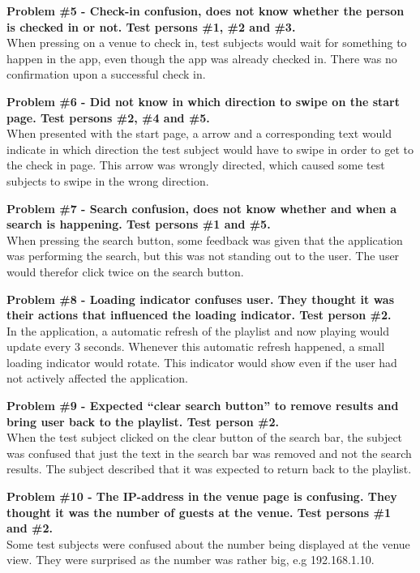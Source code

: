 \noindent\textbf{Problem \#5 - Check-in confusion, does not know whether the person is checked
    in or not. Test persons \#1, \#2 and \#3.}\\
  When pressing on a venue to check in, test subjects would wait for
  something to happen in the app, even though the app was already
  checked in. There was no confirmation upon a successful check in.

\noindent\textbf{Problem \#6 - Did not know in which direction to swipe on the start page. Test
    persons \#2, \#4 and \#5.}\\
  When presented with the start page, a arrow and a corresponding text
  would indicate in which direction the test subject would have to
  swipe in order to get to the check in page. This arrow was wrongly
  directed, which caused some test subjects to swipe in the wrong direction.

\noindent\textbf{Problem \#7 - Search confusion, does not know whether and when a search is
    happening. Test persons \#1 and \#5.}\\
  When pressing the search button, some feedback was given that the
  application was performing the search, but this was not standing out
  to the user. The user would therefor click twice on the search button.

\noindent\textbf{Problem \#8 - Loading indicator confuses user. They thought it was their actions
    that influenced the loading indicator. Test person \#2.}\\
  In the application, a automatic refresh of the playlist and
  now playing would update every 3 seconds. Whenever this automatic
  refresh happened, a small loading indicator would rotate. This
  indicator would show even if the user had not actively affected the application.

\noindent\textbf{Problem \#9 - Expected \enquote{clear search button}
  to remove results and bring user back to the playlist. Test person \#2.}\\
  When the test subject clicked on the clear button of the search bar,
  the subject was confused that just the text in the search bar was
  removed and not the search results. The subject described that it
  was expected to return back to the playlist.

\noindent\textbf{Problem \#10 - The IP-address in the venue page is
  confusing. They thought it was the number of guests at the venue. Test persons \#1 and \#2.}\\
  Some test subjects were confused about the number being displayed at
  the venue view. They were surprised as the number was rather big,
  e.g 192.168.1.10.

